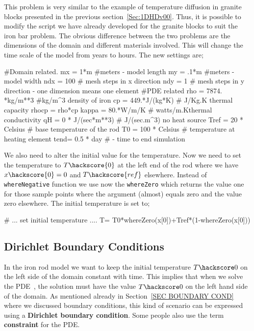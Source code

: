 This problem is very similar to the example of temperature diffusion in granite
blocks presented in the previous section~\ref{Sec:1DHDv00}. Thus, it is possible
to modify the script we have already developed for the granite blocks to suit
the iron bar problem.  
The obvious difference between the two problems are the dimensions of the domain
and different materials involved. This will change the time scale of the model
from years to hours. 
The new settings are;
\begin{python}
#Domain related.
mx = 1*m #meters - model length
my = .1*m #meters - model width
ndx = 100 # mesh steps in x direction 
ndy = 1 # mesh steps in y direction - one dimension means one element
#PDE related
rho = 7874. *kg/m**3 #kg/m^{3} density of iron
cp = 449.*J/(kg*K) # J/Kg.K thermal capacity
rhocp = rho*cp 
kappa = 80.*W/m/K   # watts/m.Kthermal conductivity
qH = 0 * J/(sec*m**3) # J/(sec.m^{3}) no heat source
Tref = 20 * Celsius  # base temperature of the rod
T0 = 100 * Celsius # temperature at heating element
tend= 0.5 * day # - time to end simulation
\end{python}
We also need to alter the initial value for the temperature. Now we need to set
the 
temperature to $T\hackscore{0}$ at the left end of the rod where we have
$x\hackscore{0}=0$ and 
$T\hackscore{ref}$ elsewhere. Instead of \verb|whereNegative| function we use
now the 
\verb|whereZero| which returns the value one for those sample points where 
the argument (almost) equals zero and the value zero elsewhere. The initial
temperature is set to;
\begin{python}
# ... set initial temperature ....
T= T0*whereZero(x[0])+Tref*(1-whereZero(x[0]))
\end{python}

\subsection{Dirichlet Boundary Conditions}
In the iron rod model  we want to keep the initial temperature $T\hackscore0$ on
the left side of the domain constant with time. 
This implies that when we solve the PDE~, the solution must
have the value $T\hackscore0$ on the left hand
side of the domain. As mentioned already in Section~\ref{SEC BOUNDARY COND}
where we discussed
boundary conditions, this kind of scenario can be expressed using a
\textbf{Dirichlet boundary condition}. Some people also
use the term \textbf{constraint} for the PDE. 

